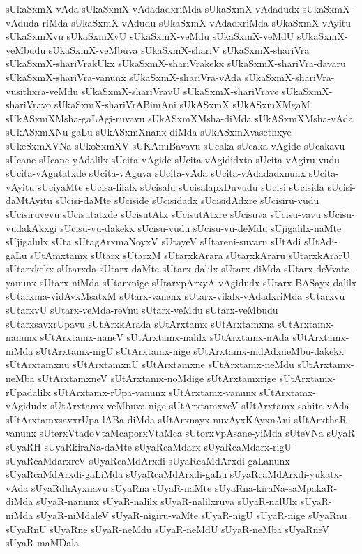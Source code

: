 {sUkaSxmX-vAda
sUkaSxmX-vAdadadxriMda
sUkaSxmX-vAdadudx
sUkaSxmX-vAduda-riMda
sUkaSxmX-vAdudu
sUkaSxmX-vAdadxriMda
sUkaSxmX-vAyitu
sUkaSxmXvu
sUkaSxmXvU
sUkaSxmX-veMdu
sUkaSxmX-veMdU
sUkaSxmX-veMbudu
sUkaSxmX-veMbuva
sUkaSxmX-shariV
sUkaSxmX-shariVra
sUkaSxmX-shariVrakUkx
sUkaSxmX-shariVrakekx
sUkaSxmX-shariVra-davaru
sUkaSxmX-shariVra-vanunx
sUkaSxmX-shariVra-vAda
sUkaSxmX-shariVra-vusithxra-veMdu
sUkaSxmX-shariVravU
sUkaSxmX-shariVrave
sUkaSxmX-shariVravo
sUkaSxmX-shariVrABimAni
sUkASxmX
sUkASxmXMgaM
sUkASxmXMsha-gaLAgi-ruvavu
sUkASxmXMsha-diMda
sUkASxmXMsha-vAda
sUkASxmXNu-gaLu
sUkASxmXnanx-diMda
sUkASxmXvasethxye
sUkeSxmXVNa
sUkoSxmXV
sUKAnuBavavu
sUcaka
sUcaka-vAgide
sUcakavu
sUcane
sUcane-yAdalilx
sUcita-vAgide
sUcita-vAgididxto
sUcita-vAgiru-vudu
sUcita-vAgutatxde
sUcita-vAguva
sUcita-vAda
sUcita-vAdadadxnunx
sUcita-vAyitu
sUciyaMte
sUcisa-lilalx
sUcisalu
sUcisalapxDuvudu
sUcisi
sUcisida
sUcisi-daMtAyitu
sUcisi-daMte
sUciside
sUcisidadx
sUcisidAdxre
sUcisiru-vudu
sUcisiruvevu
sUcisutatxde
sUcisutAtx
sUcisutAtxre
sUcisuva
sUcisu-vavu
sUcisu-vudakAkxgi
sUcisu-vu-dakekx
sUcisu-vudu
sUcisu-vu-deMdu
sUjigalilx-naMte
sUjigalulx
sUta
sUtagArxmaNoyxV
sUtayeV
sUtareni-suvaru
sUtAdi
sUtAdi-gaLu
sUtAmxtamx
sUtarx
sUtarxM
sUtarxkArara
sUtarxkAraru
sUtarxkArarU
sUtarxkekx
sUtarxda
sUtarx-daMte
sUtarx-dalilx
sUtarx-diMda
sUtarx-deVvate-yanunx
sUtarx-niMda
sUtarxnige
sUtarxpArxyA-vAgidudx
sUtarx-BASayx-dalilx
sUtarxma-vidAvxMsatxM
sUtarx-vanenx
sUtarx-vilalx-vAdadxriMda
sUtarxvu
sUtarxvU
sUtarx-veMda-reVnu
sUtarx-veMdu
sUtarx-veMbudu
sUtarxsavxrUpavu
sUtArxkArada
sUtArxtamx
sUtArxtamxna
sUtArxtamx-nanunx
sUtArxtamx-naneV
sUtArxtamx-nalilx
sUtArxtamx-nAda
sUtArxtamx-niMda
sUtArxtamx-nigU
sUtArxtamx-nige
sUtArxtamx-nidAdxneMbu-dakekx
sUtArxtamxnu
sUtArxtamxnU
sUtArxtamxne
sUtArxtamx-neMdu
sUtArxtamx-neMba
sUtArxtamxneV
sUtArxtamx-noMdige
sUtArxtamxrige
sUtArxtamx-rUpadalilx
sUtArxtamx-rUpa-vanunx
sUtArxtamx-vanunx
sUtArxtamx-vAgidudx
sUtArxtamx-veMbuva-nige
sUtArxtamxveV
sUtArxtamx-sahita-vAda
sUtArxtamxsavxrUpa-lABa-diMda
sUtArxnayx-nuvAyxKAyxnAni
sUtArxthaR-vanunx
sUterxVtadoVtaMcaporxVtaMca
sUtorxVpAsane-yiMda
sUteVNa
sUyaR
sUyaRH
sUyaRkiraNa-daMte
sUyaRcaMdarx
sUyaRcaMdarx-rigU
sUyaRcaMdarxreV
sUyaRcaMdArxdi
sUyaRcaMdArxdi-gaLanunx
sUyaRcaMdArxdi-gaLiMda
sUyaRcaMdArxdi-gaLu
sUyaRcaMdArxdi-yukatx-vAda
sUyaRdhAyxnavu
sUyaRna
sUyaR-naMte
sUyaRna-kiraNa-saMpakaR-diMda
sUyaR-nanunx
sUyaR-nalilx
sUyaR-nalilxruva
sUyaR-nalUlx
sUyaR-niMda
sUyaR-niMdaleV
sUyaR-nigiru-vaMte
sUyaR-nigU
sUyaR-nige
sUyaRnu
sUyaRnU
sUyaRne
sUyaR-neMdu
sUyaR-neMdU
sUyaR-neMba
sUyaRneV
sUyaR-maMDala
}
